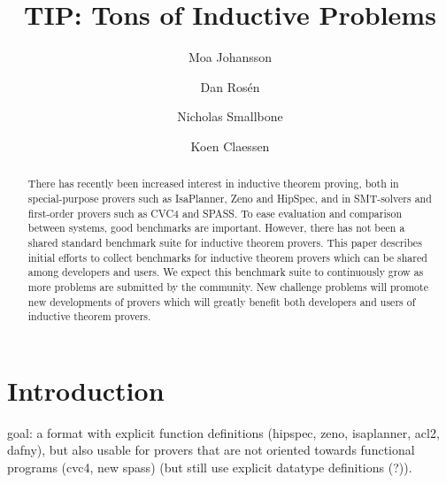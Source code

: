 \documentclass{llncs}
\begin{document}
\title{TIP: Tons of Inductive Problems}

\author{Moa Johansson \and Dan Ros\'en \and Nicholas Smallbone \and Koen Claessen}

\titlerunning{}

\maketitle

\begin{abstract}
There has recently been increased interest in inductive theorem
proving, both in special-purpose provers such as
IsaPlanner, Zeno and HipSpec, and in SMT-solvers and first-order provers such as
CVC4 and SPASS. To ease evaluation and comparison between systems,
good benchmarks are important. However, there has not been a shared
standard benchmark suite for inductive theorem provers. This paper
describes initial efforts to collect benchmarks for inductive theorem
provers which can be shared among developers and users. 
We expect this benchmark suite to continuously grow as
more problems are submitted by the community. New challenge problems
will promote new developments of provers which will greatly benefit
both developers and users of inductive theorem provers. 

\end{abstract}

\section{Introduction}

goal: a format with explicit function definitions (hipspec, zeno, isaplanner, acl2, dafny),
      but also usable for provers that are not oriented towards functional programs (cvc4, new spass)
      (but still use explicit datatype definitions (?)).

%
%
\end{document}

